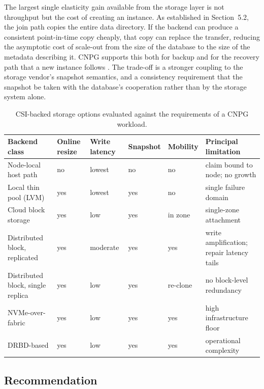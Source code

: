 \documentclass[11pt,a4paper]{article}
\begin{document}
The largest single elasticity gain available from the storage layer is not throughput but the cost of creating an instance. As established in Section~5.2, the join path copies the entire data directory. If the backend can produce a consistent point-in-time copy cheaply, that copy can replace the transfer, reducing the asymptotic cost of scale-out from the size of the database to the size of the metadata describing it. CNPG supports this both for backup and for the recovery path that a new instance follows \cite{cnpg-storage,k8s-volumesnapshot}. The trade-off is a stronger coupling to the storage vendor's snapshot semantics, and a consistency requirement that the snapshot be taken with the database's cooperation rather than by the storage system alone.

\begin{table}[h]
\centering
\caption{CSI-backed storage options evaluated against the requirements of a CNPG workload.}
\label{tab:csi}
\begin{tabular}{@{}>{\raggedright\arraybackslash}p{3.3cm}>{\raggedright\arraybackslash}p{1.55cm}>{\raggedright\arraybackslash}p{1.6cm}>{\raggedright\arraybackslash}p{1.4cm}>{\raggedright\arraybackslash}p{1.7cm}>{\raggedright\arraybackslash}p{3.3cm}@{}}
\toprule
Backend class & Online resize & Write latency & Snapshot & Mobility & Principal limitation \\
\midrule
Node-local host path & no & lowest & no & no & claim bound to node; no growth \\
Local thin pool (LVM) & yes & lowest & yes & no & single failure domain \\
Cloud block storage & yes & low & yes & in zone & single-zone attachment \\
Distributed block, replicated & yes & moderate & yes & yes & write amplification; repair latency tails \\
Distributed block, single replica & yes & low & yes & re-clone & no block-level redundancy \\
NVMe-over-fabric & yes & low & yes & yes & high infrastructure floor \\
DRBD-based & yes & low & yes & yes & operational complexity \\
\bottomrule
\end{tabular}
\end{table}

\subsection{Recommendation}
\end{document}
